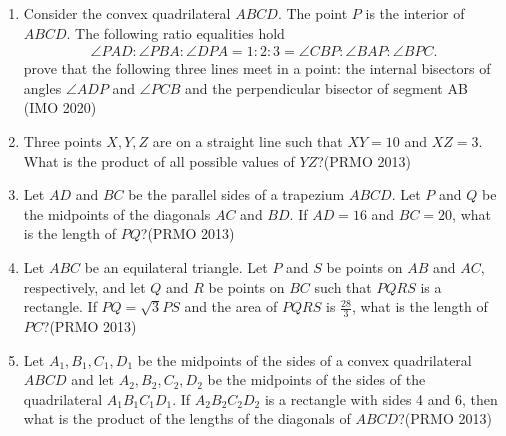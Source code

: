 \begin{enumerate}[label=\thesubsection.\arabic*,ref=\thesubsection.\theenumi]
\item Consider the convex quadrilateral $ABCD$. The point $P$ is the interior of $ABCD$. The following ratio equalities hold
\begin{align*}
\angle PAD: \angle PBA: \angle DPA =1:2:3 = \angle CBP: \angle BAP: \angle BPC.
\end{align*} 
prove
 that the following three lines meet in a point: the internal bisectors 
of angles $\angle ADP$ and $\angle PCB$ and the perpendicular bisector 
of segment AB
\hfill(IMO 2020)
\item Three points $ X, Y, Z $ are on a straight line such that $ XY = 10 $ and $ XZ = 3 $. What is the product of all possible values of $ YZ $?\hfill(PRMO 2013)

\item Let $ AD $ and $ BC $ be the parallel sides of a trapezium $ ABCD $. Let $ P $ and $ Q $ be the midpoints of the diagonals $ AC $ and $ BD $. If $ AD = 16 $ and $ BC = 20 $, what is the length of $ PQ $?\hfill(PRMO 2013)

\item Let $ ABC $ be an equilateral triangle. Let $ P $ and $ S $ be points on $ AB $ and $ AC $, respectively, and let $ Q $ and $ R $ be points on $ BC $ such that $ PQRS $ is a rectangle. If $ PQ = \sqrt{3} PS $ and the area of $ PQRS $ is $ \frac{28}{3} $, what is the length of $ PC $?\hfill(PRMO 2013)

\item Let $ A_1, B_1, C_1, D_1 $ be the midpoints of the sides of a convex quadrilateral $ ABCD $ and let $ A_2, B_2, C_2, D_2 $ be the midpoints of the sides of the quadrilateral $ A_1B_1C_1D_1 $. If $ A_2B_2C_2D_2 $ is a rectangle with sides 4 and 6, then what is the product of the lengths of the diagonals of $ ABCD $?\hfill(PRMO 2013)



\end{enumerate}
